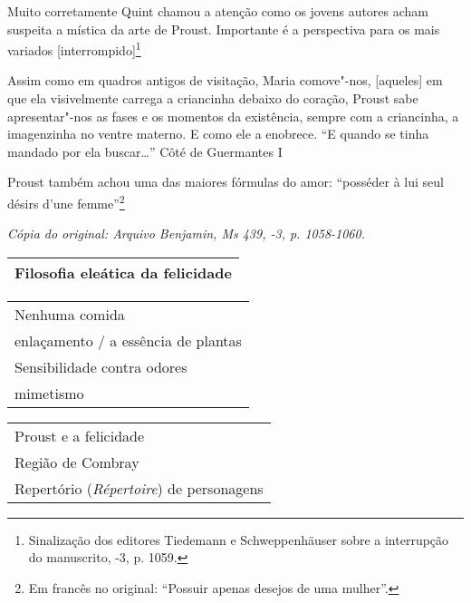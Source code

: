Muito corretamente Quint chamou a atenção como os jovens autores acham
suspeita a mística da arte de Proust. Importante é a perspectiva para os
mais variados {[}interrompido{]}\footnote{Sinalização dos editores
  Tiedemann e Schweppenhäuser sobre a interrupção do manuscrito,
  -3, p. 1059. \versal{[N. T.]}}

Assim como em quadros antigos de visitação, Maria comove"-nos,
{[}aqueles{]} em que ela visivelmente carrega a criancinha debaixo do
coração, Proust sabe apresentar"-nos as fases e os momentos da
existência, sempre com a criancinha, a imagenzinha no ventre materno. E
como ele a enobrece. ``E quando se tinha mandado por ela buscar\ldots{}''
Côté de Guermantes I

Proust também achou uma das maiores fórmulas do amor: ``posséder à lui
seul désirs d'une femme''\footnote{Em francês no original:
  ``Possuir apenas desejos de uma mulher''. \versal{[N. T.]}}

\begin{flushright}
\emph{\small{Cópia do original: Arquivo Benjamin, Ms 439, -3, p. 1058-1060.}}
\end{flushright}


\begin{table}[httn!]
\begin{tabular}{|l|}
\hline
Filosofia eleática da felicidade \\ \hline
\end{tabular}
\end{table}

\begin{table}[httn!]
\begin{tabular}{|l|}
\hline
Nenhuma comida                      \\
enlaçamento / a essência de plantas \\
Sensibilidade contra odores         \\
mimetismo                           \\ \hline
\end{tabular}
\end{table}

\begin{table}[httn!]
\begin{tabular}{|l|}
\hline
Proust e a felicidade                                          \\
Região de Combray                                              \\
Repertório (\emph{Répertoire}) de personagens \\ \hline
\end{tabular}
\end{table}


